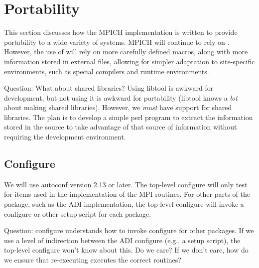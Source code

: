 \documentclass{article}
\begin{document}

\section{Portability}

This section discusses how the MPICH implementation is written to
provide portability to a wide variety of systems.  MPICH will continue
to rely on .  However, the use of 
will rely on more carefully defined macros, along with more
information stored in external files, allowing for simpler adaptation
to site-specific environments, such as special compilers and runtime
environments. 

Question: What about shared libraries?  Using libtool is awkward for
development, but not using it is awkward for portability (libtool
knows a \emph{lot} about making shared libraries).  However, we
\emph{must} have support for shared libraries.  The plan is to develop
a simple perl program to extract the information stored in the
 source to take advantage of that source of information
without requiring the  development environment.

\subsection{Configure}
We will use autoconf version 2.13 or later.  The top-level configure will only
test for items used in the implementation of the MPI routines.  For
other parts of the package, such as the ADI implementation, the
top-level configure will invoke a configure or other setup script for
each package.

Question: configure understands how to invoke configure for other
packages.  If we use a level of indirection between the ADI configure
(e.g., a setup script), the top-level configure won't know about
this.  Do we care?  If we don't care, how do we ensure that
re-executing  executes the correct routines?
\end{document}
